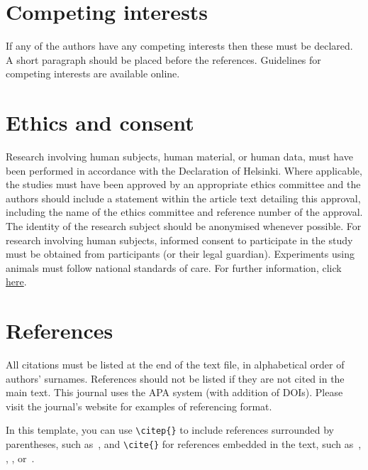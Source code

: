 \documentclass[ProofPDF]{./Styles/Jnls-Template-V3}
\begin{document}
\section{Competing interests}

If any of the authors have any competing interests then these
must be declared. A short paragraph should be placed before
the references.
Guidelines for competing interests are available online.%


\section{Ethics and consent}

Research involving human subjects, human material, or human data,
must have been performed in accordance with the Declaration of Helsinki.
Where applicable, the studies must have been approved by an appropriate
ethics committee and the authors should include a statement within
the article text detailing this approval, including the name of the ethics committee and reference number of the approval.
The identity of the research subject should be anonymised whenever possible.
For research involving human subjects, informed consent to participate
in the study must be obtained from participants (or their legal guardian).
%
Experiments using animals must follow national standards of care.
For further information, click \href{http://bit.ly/1rBoe0S}{here}.


\section{References}

All citations must be listed at the end of the text file,
in alphabetical order of authors' surnames.
References should not be listed if they are not cited in
the main text.
This journal uses the APA system (with addition of DOIs).
Please visit the journal's website
for examples of referencing format.

In this template, you can use \verb=\citep{}= to include references
surrounded by parentheses, such as~\citep{KneesS16_MusicSimilarityRetrieval_SPRINGER}, and \verb=\cite{}=
for references embedded in the text,
such as~\cite{WeihsJVR16_MusicDataAnalysis_CRC},
\cite{SerraEtAl13_RoadmapMIR_CreativeCommon},
\cite{Lerch23_AudioContentAnalysis_WILEY},
or~\cite{Mueller21_FMP_SPRINGER}.
\end{document}
